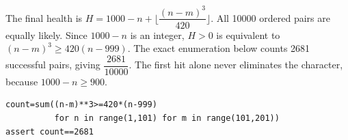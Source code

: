 The final health is $H=1000-n+\lfloor\dfrac{(n-m)^3}{420}\rfloor$. All 10000 ordered pairs are equally likely. Since $1000-n$ is an integer, $H>0$ is equivalent to $(n-m)^3\ge420(n-999)$. The exact enumeration below counts 2681 successful pairs, giving $\boxed{\dfrac{2681}{10000}}$. The first hit alone never eliminates the character, because $1000-n\ge900$.
\begin{verbatim}
count=sum((n-m)**3>=420*(n-999)
          for n in range(1,101) for m in range(101,201))
assert count==2681
\end{verbatim}
